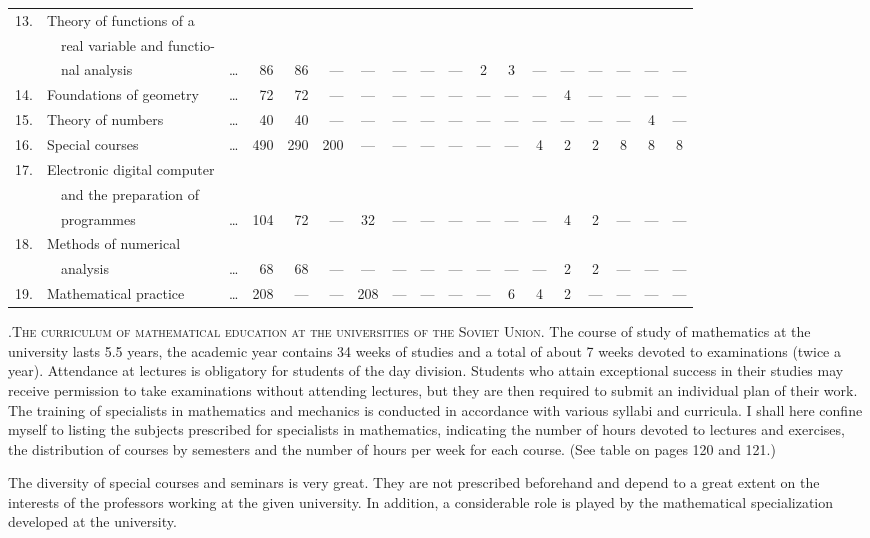\begin{landscape}
{\begin{longtable}[l]{llc@{\,}rrrcccccccccccc}
 13. & Theory of functions of a &&&&&&&&\\[-0.3cm]
& ~~real variable  and functio-&&&&&&&&\\[-0.3cm]
& ~~nal analysis & \ldots & 86 & 86 &
 ---&---&---&---&---&2&3&---&---&---&---&---&---\\
14. & Foundations of geometry & \ldots & 72 & 72 &
---&---&---&---&---&---&---&---& 4 & ---&---&---&---\\
15. & Theory of numbers &\ldots & 40 &40
&---&---&---&---&---&---&---&---&---&---&---&4&---\\
16. & Special courses & \ldots & 490 & 290 & 200 &
---&---&---&---&---&---& 4&2&2&8&8&8\\ 
17. & Electronic digital computer&&&&&&&\\[-0.3cm]
& ~~and the preparation of &&&&&&&\\[-0.3cm]
& ~~programmes & \ldots & 104 & 72& ---&32 &
---&---&---&---&---&---&4&2&---&---&---\\
18. & Methods of numerical &&&&&\\[-0.3cm]
& ~~analysis & \ldots & 68 & 68 &
---&---&---&---&---&---&---&---&2&2&---&---&---\\
19. & Mathematical practice & \ldots & 208 & ---&---&208 &
---&---&---&---&6&4&2&---&---&---&---\\
\end{longtable}}\relax
\end{landscape}

\medskip
\setcounter{pageoriginal}{121}
.\pageoriginale \textsc{The curriculum of mathematical education at the
  universities of the Soviet Union.} The course of study of
mathematics at the university lasts 5.5 years, the academic year
contains 34 weeks of studies and a total of about 7 weeks devoted to
examinations (twice a year). Attendance at lectures is obligatory for
students of the day division. Students who attain exceptional success
in their studies may receive permission to take examinations without
attending lectures, but they are then required to submit an individual
plan of their work. The training of specialists in mathematics and
mechanics is conducted in accordance with various syllabi and
curricula. I shall here confine myself to listing the subjects
prescribed for specialists in mathematics, indicating the number of
hours devoted to lectures and exercises, the distribution of courses
by semesters and the number of hours per week for each course. (See
table on pages 120 and 121.)


The diversity of special courses and seminars is very great. They are
not prescribed beforehand and depend to a great extent on the
interests of the professors working at the given university. In
addition, a considerable role is played by the mathematical
specialization developed at the university.

